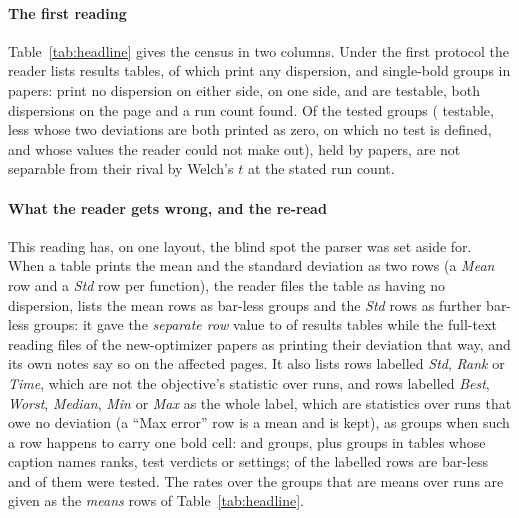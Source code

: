 \documentclass[preprint,review,12pt]{elsarticle}
\begin{document}
\paragraph{The first reading} Table~\ref{tab:headline} gives the census in two columns. Under the first protocol the reader lists \nCrResultsTables{} results tables, of which \nCrTablesAnyBar{} print any dispersion, and \nCzGroups{} single-bold groups in \nCzPapersWithGroups{} papers: \nCrAllNeither{} \nCrAllNeitherCi{} print no dispersion on either side, \nCrAllOneSide{} on one side, and \nCrAllTestable{} \nCrAllTestableCi{} are testable, both dispersions on the page and a run count found. Of the \nCrAllTested{} tested groups (\nCrAllTestableN{} testable, less \nCrAllZeroBoth{} whose two deviations are both printed as zero, on which no test is defined, and \nCrAllUnreadable{} whose values the reader could not make out), held by \nCrPpPapers{} papers, \nCrAllFail{} \nCrAllFailCi{} are not separable from their rival by Welch's $t$ at the stated run count.

\paragraph{What the reader gets wrong, and the re-read} This reading has, on one layout, the blind spot the parser was set aside for. When a table prints the mean and the standard deviation as two rows (a \emph{Mean} row and a \emph{Std} row per function), the reader files the table as having no dispersion, lists the mean rows as bar-less groups and the \emph{Std} rows as further bar-less groups: it gave the \emph{separate row} value to \nCrFormSeparateRow{} of \nCrResultsTables{} results tables while the full-text reading files \nTrNewOptimizerLayoutSeparateRowPct{} of the new-optimizer papers as printing their deviation that way, and its own notes say so on the affected pages. It also lists rows labelled \emph{Std}, \emph{Rank} or \emph{Time}, which are not the objective's statistic over runs, and rows labelled \emph{Best}, \emph{Worst}, \emph{Median}, \emph{Min} or \emph{Max} as the whole label, which are statistics over runs that owe no deviation (a ``Max error'' row is a mean and is kept), as groups when such a row happens to carry one bold cell: \nCrRowsStdRowGroups{} and \nCrRowsBestRowGroups{} groups, plus \nCrRowsNotMeansTableGroups{} groups in tables whose caption names ranks, test verdicts or settings; \nCrRowsOnlyNeither{} of the labelled rows are bar-less and \nCrRowsOnlyTested{} of them were tested. The rates over the groups that are means over runs are given as the \emph{means} rows of Table~\ref{tab:headline}.
\end{document}
